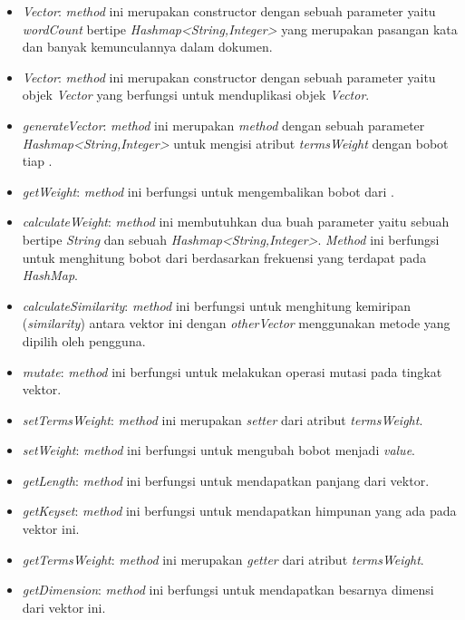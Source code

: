 \begin{itemize}
	\item \textit{Vector}: \textit{method} ini merupakan constructor dengan sebuah parameter yaitu \textit{wordCount} bertipe \textit{Hashmap<String,Integer>} yang merupakan pasangan kata dan banyak kemunculannya dalam dokumen.
	\item \textit{Vector}: \textit{method} ini merupakan constructor dengan sebuah parameter yaitu objek \textit{Vector} yang berfungsi untuk menduplikasi objek \textit{Vector}.
	\item \textit{generateVector}: \textit{method} ini merupakan \textit{method} dengan sebuah parameter \textit{Hashmap<String,Integer>} untuk mengisi atribut \textit{termsWeight} dengan bobot tiap \term.
	\item \textit{getWeight}: \textit{method} ini berfungsi untuk mengembalikan bobot dari \term.
	\item \textit{calculateWeight}: \textit{method} ini membutuhkan dua buah parameter yaitu sebuah \term bertipe \textit{String} dan sebuah \textit{Hashmap<String,Integer>}. \textit{Method} ini berfungsi untuk menghitung bobot dari \term berdasarkan frekuensi yang terdapat pada \textit{HashMap}.
	\item \textit{calculateSimilarity}: \textit{method} ini berfungsi untuk menghitung kemiripan (\textit{similarity}) antara vektor ini dengan \textit{otherVector} menggunakan metode yang dipilih oleh pengguna.
	\item \textit{mutate}: \textit{method} ini berfungsi untuk melakukan operasi mutasi pada tingkat vektor.
	\item \textit{setTermsWeight}: \textit{method} ini merupakan \textit{setter} dari atribut \textit{termsWeight}.
	\item \textit{setWeight}: \textit{method} ini berfungsi untuk mengubah bobot \term menjadi \textit{value}.
	\item \textit{getLength}: \textit{method} ini berfungsi untuk mendapatkan panjang dari vektor.
	\item \textit{getKeyset}: \textit{method} ini berfungsi untuk mendapatkan himpunan \term yang ada pada vektor ini.
	\item \textit{getTermsWeight}: \textit{method} ini merupakan \textit{getter} dari atribut \textit{termsWeight}.
	\item \textit{getDimension}: \textit{method} ini berfungsi untuk mendapatkan besarnya dimensi dari vektor ini.
\end{itemize}

